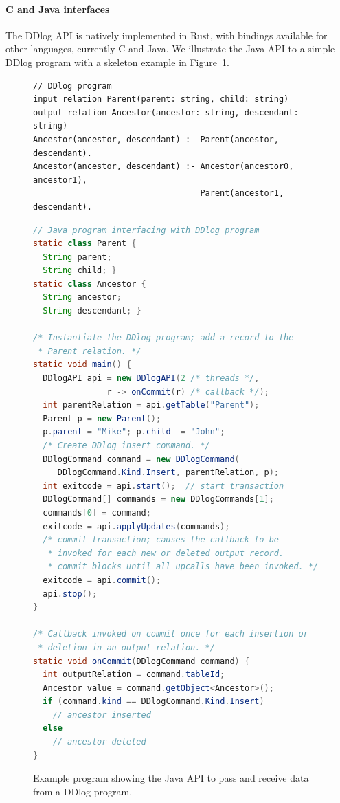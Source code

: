 \paragraph{C and Java interfaces}
The DDlog API is natively
implemented in Rust, with bindings available for other languages,
currently C and Java.
We illustrate the Java API to a simple DDlog program with a
skeleton example in Figure~\ref{fig:javaapi}.

\begin{figure}
  \footnotesize
  \begin{lstlisting}[language=ddlog]
// DDlog program
input relation Parent(parent: string, child: string)
output relation Ancestor(ancestor: string, descendant: string)
Ancestor(ancestor, descendant) :- Parent(ancestor, descendant).
Ancestor(ancestor, descendant) :- Ancestor(ancestor0, ancestor1),
                                  Parent(ancestor1, descendant).
  \end{lstlisting}

  \begin{lstlisting}[language=Java]
// Java program interfacing with DDlog program
static class Parent {
  String parent;
  String child; }
static class Ancestor {
  String ancestor;
  String descendant; }

/* Instantiate the DDlog program; add a record to the
 * Parent relation. */
static void main() {
  DDlogAPI api = new DDlogAPI(2 /* threads */,
               r -> onCommit(r) /* callback */);
  int parentRelation = api.getTable("Parent");
  Parent p = new Parent();
  p.parent = "Mike"; p.child  = "John";
  /* Create DDlog insert command. */
  DDlogCommand command = new DDlogCommand(
     DDlogCommand.Kind.Insert, parentRelation, p);
  int exitcode = api.start();  // start transaction
  DDlogCommand[] commands = new DDlogCommands[1];
  commands[0] = command;
  exitcode = api.applyUpdates(commands);
  /* commit transaction; causes the callback to be
   * invoked for each new or deleted output record.
   * commit blocks until all upcalls have been invoked. */
  exitcode = api.commit();
  api.stop();
}

/* Callback invoked on commit once for each insertion or
 * deletion in an output relation. */
static void onCommit(DDlogCommand command) {
  int outputRelation = command.tableId;
  Ancestor value = command.getObject<Ancestor>();
  if (command.kind == DDlogCommand.Kind.Insert)
    // ancestor inserted
  else
    // ancestor deleted
}
\end{lstlisting}
\caption{Example program showing the Java API to pass and receive data
  from a DDlog program.\label{fig:javaapi}}
\end{figure}
